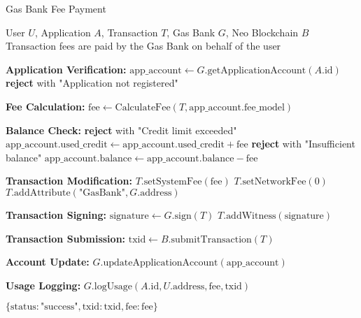 \begin{tcolorbox}[
    enhanced,
    colback=blue!5!white,
    colframe=blue!75!black,
    arc=5mm,
    boxrule=1.5pt,
    title=Gas Bank Fee Payment Protocol,
    fonttitle=\bfseries,
    coltitle=white,
    attach boxed title to top left={yshift=-2mm, xshift=5mm},
    boxed title style={colback=blue!75!black, rounded corners},
    shadow={2mm}{-2mm}{0mm}{black!50},
    drop fuzzy shadow
]
\begin{protocol}{Gas Bank Fee Payment}
\label{prot:gas-bank-fee-payment}
\begin{algorithmic}[1]
\Require User $U$, Application $A$, Transaction $T$, Gas Bank $G$, Neo Blockchain $B$
\Ensure Transaction fees are paid by the Gas Bank on behalf of the user

\State \textbf{Application Verification:}
\State $\text{app\_account} \gets G.\text{getApplicationAccount}(A.\text{id})$
    \State \textbf{reject} with "Application not registered"
\EndIf

\State \textbf{Fee Calculation:}
\State $\text{fee} \gets \text{CalculateFee}(T, \text{app\_account}.\text{fee\_model})$

\State \textbf{Balance Check:}
            \State \textbf{reject} with "Credit limit exceeded"
        \EndIf
        \State $\text{app\_account}.\text{used\_credit} \gets \text{app\_account}.\text{used\_credit} + \text{fee}$
    \Else
        \State \textbf{reject} with "Insufficient balance"
    \EndIf
\Else
    \State $\text{app\_account}.\text{balance} \gets \text{app\_account}.\text{balance} - \text{fee}$
\EndIf

\State \textbf{Transaction Modification:}
\State $T.\text{setSystemFee}(\text{fee})$
\State $T.\text{setNetworkFee}(0)$
\State $T.\text{addAttribute}(\text{"GasBank"}, G.\text{address})$

\State \textbf{Transaction Signing:}
\State $\text{signature} \gets G.\text{sign}(T)$
\State $T.\text{addWitness}(\text{signature})$

\State \textbf{Transaction Submission:}
\State $\text{txid} \gets B.\text{submitTransaction}(T)$

\State \textbf{Account Update:}
\State $G.\text{updateApplicationAccount}(\text{app\_account})$

\State \textbf{Usage Logging:}
\State $G.\text{logUsage}(A.\text{id}, U.\text{address}, \text{fee}, \text{txid})$

\State \Return $\{\text{status}: \text{"success"}, \text{txid}: \text{txid}, \text{fee}: \text{fee}\}$
\end{algorithmic}
\end{protocol}
\end{tcolorbox}
